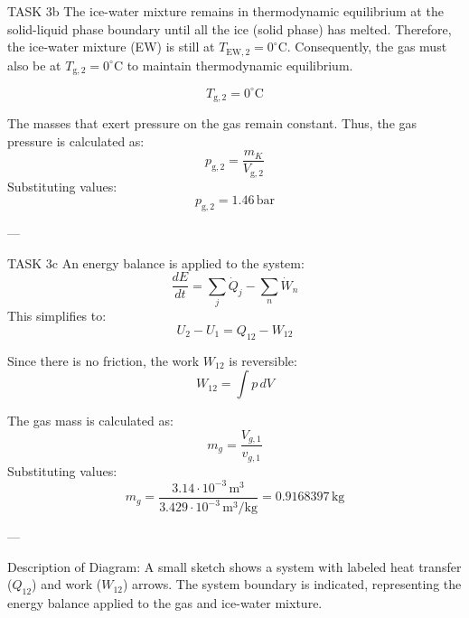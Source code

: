 TASK 3b  
The ice-water mixture remains in thermodynamic equilibrium at the solid-liquid phase boundary until all the ice (solid phase) has melted. Therefore, the ice-water mixture (EW) is still at \( T_{\text{EW},2} = 0^\circ\text{C} \). Consequently, the gas must also be at \( T_{\text{g},2} = 0^\circ\text{C} \) to maintain thermodynamic equilibrium.  

\[
T_{\text{g},2} = 0^\circ\text{C}
\]

The masses that exert pressure on the gas remain constant. Thus, the gas pressure is calculated as:  
\[
p_{\text{g},2} = \frac{m_K}{V_{\text{g},2}}
\]
Substituting values:  
\[
p_{\text{g},2} = 1.46 \, \text{bar}
\]

---

TASK 3c  
An energy balance is applied to the system:  
\[
\frac{dE}{dt} = \sum_j \dot{Q}_j - \sum_n \dot{W}_n
\]
This simplifies to:  
\[
U_2 - U_1 = Q_{12} - W_{12}
\]

Since there is no friction, the work \( W_{12} \) is reversible:  
\[
W_{12} = \int p \, dV
\]

The gas mass is calculated as:  
\[
m_g = \frac{V_{g,1}}{v_{g,1}}
\]
Substituting values:  
\[
m_g = \frac{3.14 \cdot 10^{-3} \, \text{m}^3}{3.429 \cdot 10^{-3} \, \text{m}^3/\text{kg}} = 0.9168397 \, \text{kg}
\]

---

Description of Diagram:  
A small sketch shows a system with labeled heat transfer (\( Q_{12} \)) and work (\( W_{12} \)) arrows. The system boundary is indicated, representing the energy balance applied to the gas and ice-water mixture.